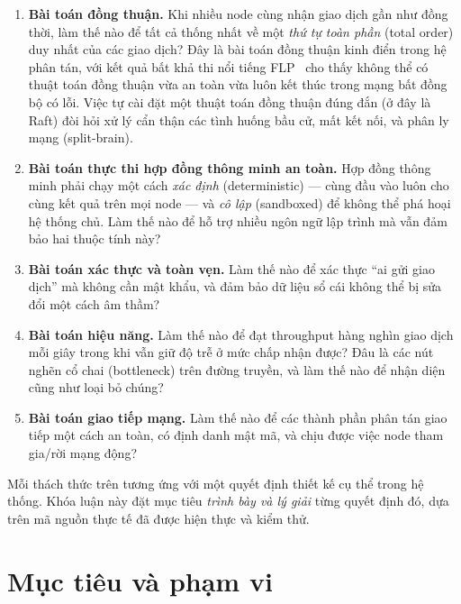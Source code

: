 \begin{enumerate}
  \item \textbf{Bài toán đồng thuận.} Khi nhiều node cùng nhận giao dịch gần
  như đồng thời, làm thế nào để tất cả thống nhất về một \textit{thứ tự toàn
  phần} (total order) duy nhất của các giao dịch? Đây là bài toán đồng thuận
  kinh điển trong hệ phân tán, với kết quả bất khả thi nổi tiếng
  FLP~\cite{fischer1985flp} cho thấy không thể có thuật toán đồng thuận vừa an
  toàn vừa luôn kết thúc trong mạng bất đồng bộ có lỗi. Việc tự cài đặt một
  thuật toán đồng thuận đúng đắn (ở đây là Raft) đòi hỏi xử lý cẩn thận các tình
  huống bầu cử, mất kết nối, và phân ly mạng (split-brain).

  \item \textbf{Bài toán thực thi hợp đồng thông minh an toàn.} Hợp đồng thông
  minh phải chạy một cách \textit{xác định} (deterministic) --- cùng đầu vào
  luôn cho cùng kết quả trên mọi node --- và \textit{cô lập} (sandboxed) để
  không thể phá hoại hệ thống chủ. Làm thế nào để hỗ trợ nhiều ngôn ngữ lập
  trình mà vẫn đảm bảo hai thuộc tính này?

  \item \textbf{Bài toán xác thực và toàn vẹn.} Làm thế nào để xác thực ``ai
  gửi giao dịch'' mà không cần mật khẩu, và đảm bảo dữ liệu sổ cái không thể bị
  sửa đổi một cách âm thầm?

  \item \textbf{Bài toán hiệu năng.} Làm thế nào để đạt throughput hàng nghìn
  giao dịch mỗi giây trong khi vẫn giữ độ trễ ở mức chấp nhận được? Đâu là các
  nút nghẽn cổ chai (bottleneck) trên đường truyền, và làm thế nào để nhận diện
  cũng như loại bỏ chúng?

  \item \textbf{Bài toán giao tiếp mạng.} Làm thế nào để các thành phần phân tán
  giao tiếp một cách an toàn, có định danh mật mã, và chịu được việc node tham
  gia/rời mạng động?
\end{enumerate}

Mỗi thách thức trên tương ứng với một quyết định thiết kế cụ thể trong hệ thống.
Khóa luận này đặt mục tiêu \textit{trình bày và lý giải} từng quyết định đó, dựa
trên mã nguồn thực tế đã được hiện thực và kiểm thử.

\section{Mục tiêu và phạm vi}
\label{sec:objectives-scope}


